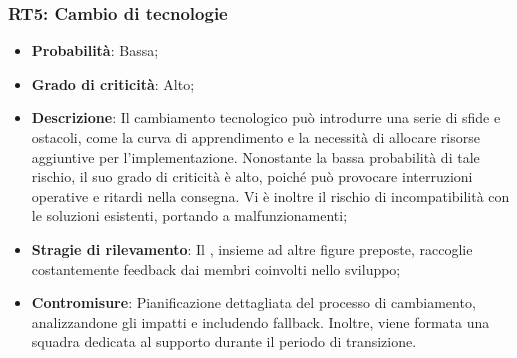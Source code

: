 \subsubsection{RT5: Cambio di tecnologie}
\begin{itemize}
    \item \textbf{Probabilità}: Bassa;
    \item \textbf{Grado di criticità}: Alto;
    \item \textbf{Descrizione}: Il cambiamento tecnologico può introdurre una serie di sfide e ostacoli, come la curva di apprendimento e la necessità di allocare risorse aggiuntive per l'implementazione. Nonostante la bassa probabilità di tale rischio, il suo grado di criticità è alto, poiché può provocare interruzioni operative e ritardi nella consegna. Vi è inoltre il rischio di incompatibilità con le soluzioni esistenti, portando a malfunzionamenti;
    \item \textbf{Stragie di rilevamento}: Il \Responsabile{}, insieme ad altre figure preposte, raccoglie costantemente feedback dai membri coinvolti nello sviluppo;
    \item \textbf{Contromisure}: Pianificazione dettagliata del processo di cambiamento, analizzandone gli impatti e includendo fallback. Inoltre, viene formata una squadra dedicata al supporto durante il periodo di transizione.
\end{itemize}
